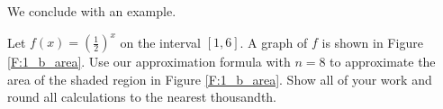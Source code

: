 We conclude with an example.

\begin{pactivity} Let $f(x) = \left(\frac{1}{2}\right)^x$ on the interval $[1,6]$. A graph of $f$ is shown in Figure \ref{F:1_b_area}. Use our approximation formula with $n=8$ to approximate the area of the shaded region in Figure \ref{F:1_b_area}. Show all of your work and round all calculations to the nearest thousandth. 

\end{pactivity}



